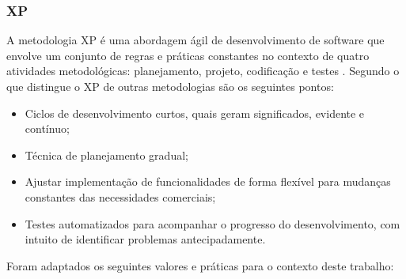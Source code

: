 \subsubsection[XP]{XP}
A metodologia XP é uma abordagem ágil de desenvolvimento de software que envolve um conjunto de regras e práticas constantes no contexto de quatro atividades metodológicas: planejamento, projeto, codificação e testes \cite{pressman2021engenharia}. Segundo  o que distingue o XP de outras metodologias são os seguintes pontos:

\begin{itemize}

\item Ciclos de desenvolvimento curtos, quais geram significados, evidente e contínuo;

\item Técnica de planejamento gradual;

\item Ajustar implementação de funcionalidades de forma flexível para mudanças constantes das necessidades comerciais;

\item Testes automatizados para acompanhar o progresso do desenvolvimento, com intuito de identificar problemas antecipadamente.

\end{itemize}


Foram adaptados os seguintes valores e práticas para o contexto deste trabalho: 

